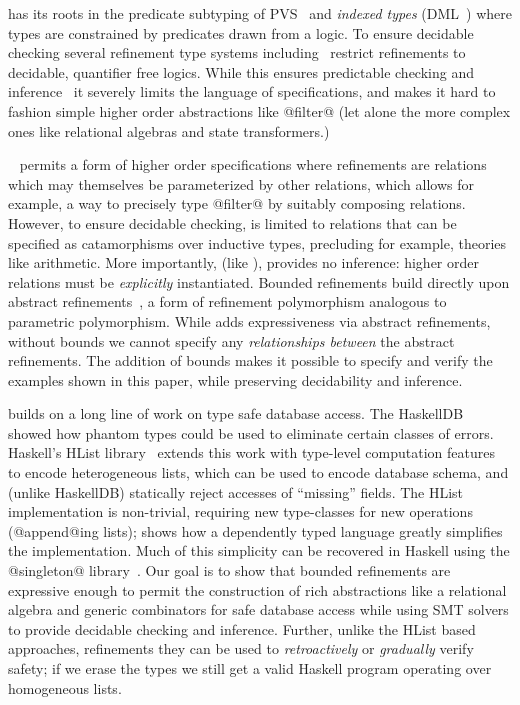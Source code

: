 %
has its roots in the predicate subtyping
of PVS~\cite{Rushby98} and \emph{indexed types}
(DML~\cite{pfenningxi98}) where types are constrained
by predicates drawn from a logic.
%
To ensure decidable checking several refinement
type systems including~\citep{pfenningxi98,Dunfield07,Vazou14}
restrict refinements to decidable, quantifier free logics.
%
While this ensures predictable checking and inference~\cite{LiquidPLDI08}
it severely limits the language of specifications, and makes it hard to
fashion simple higher order abstractions like @filter@ (let alone the more
complex ones like relational algebras and state transformers.)

%
\catalyst~\citep{catalyst} permits a form of
higher order specifications where refinements
are relations which may themselves be parameterized
by other relations, which allows for example, a
way to precisely type @filter@ by suitably
composing relations.
%
However, to ensure decidable checking, \catalyst
is limited to relations that can be specified as
catamorphisms over inductive types, precluding
for example, theories like arithmetic.
More importantly, (like \fstar), \catalyst provides
no inference: higher order relations must be
\emph{explicitly} instantiated.
%
Bounded refinements build directly upon
abstract refinements~\citep{vazou13},
a form of refinement polymorphism
analogous to parametric polymorphism.
%
While \cite{vazou13} adds expressiveness via
abstract refinements, without bounds we cannot
specify any \emph{relationships between} the
abstract refinements. The addition of bounds
makes it possible to specify and verify the examples
shown in this paper,
while preserving decidability and inference.

 builds on a long
line of work on type safe database access.
%
The HaskellDB~\citep{haskellDB}
showed how phantom types could be used to eliminate
certain classes of errors.
%
Haskell's HList library~\citep{heterogeneous}
extends this work with type-level computation
features to encode heterogeneous lists, which
can be used to encode database schema, and
(unlike HaskellDB) statically reject accesses
of ``missing'' fields.
%
The HList implementation is non-trivial,
requiring new type-classes for new operations
(\eg @append@ing lists); \citep{thepipower}
shows how a dependently typed language greatly
simplifies the implementation.
%
Much of this simplicity can be recovered in
Haskell using the @singleton@ library~\citep{Weirich12}.
%
Our goal is to show that bounded refinements
are expressive enough to permit the construction
of rich abstractions like a relational algebra
and generic combinators for safe database access
while using SMT solvers to provide decidable
checking and inference. Further, unlike the
HList based approaches, refinements they can
be used to \emph{retroactively} or \emph{gradually}
verify safety; if we erase the types we still
get a valid Haskell program operating over
homogeneous lists.


